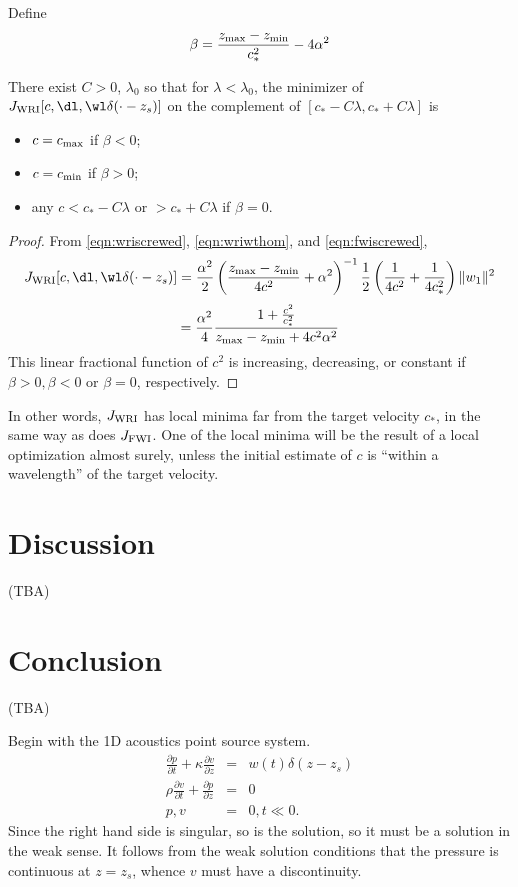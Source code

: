 Define
\begin{equation}
  \label{eqn:defbeta}
\beta = \frac{z_{\rm max}-z_{\rm min}}{c_*^2} - 4 \alpha^2
\end{equation}
\begin{theorem}
  \label{thm:thm2}
  There exist $C>0$, $\lambda_0$ so that for $\lambda <
  \lambda_0$, the minimizer of $J_{\rm WRI}[c,\dl,\wl \delta(\cdot-z_s)]$ on the
  complement of $[c_*-C\lambda, c_*+C\lambda]$ is
  \begin{itemize}
  \item $c=c_{\rm max}$ if $\beta<0$;
  \item $c=c_{\rm min}$ if $\beta>0$;
  \item any $c < c_*-C\lambda$ or $>c_*+C\lambda$ if $\beta=0$.
  \end{itemize}
\end{theorem}
\begin{proof}
  From \ref{eqn:wriscrewed}, \ref{eqn:wriwthom}, and
  \ref{eqn:fwiscrewed},
  \[
    J_{\rm WRI}[c,\dl,\wl\delta(\cdot-z_s)] =
    \frac{\alpha^2}{2}\left(\frac{z_{\rm max}-z_{\rm
          min}}{4c^2}+\alpha^2\right)^{-1}\frac{1}{2}\left(\frac{1}{4c^2}+\frac{1}{4c_*^2}\right)\|w_1\|^2
  \]
  \[
    =
    \frac{\alpha^2}{4}\frac{1+\frac{c^2}{c_*^2}}{z_{\rm 
        max}-z_{\rm min}+4c^2\alpha^2}
  \]
  This linear fractional function of $c^2$ is increasing, decreasing,
  or constant if $\beta>0, \beta<0$ or $\beta=0$, respectively.
\end{proof}

In other words, $J_{\rm WRI}$ has local minima far from the target
velocity $c_*$, in the same way as does $J_{\rm FWI}$. One of the
local minima will be the result of a local optimization almost surely,
unless the initial estimate of $c$ is ``within a wavelength'' of the
target velocity.

\section{Discussion}

(TBA)

\section{Conclusion}

(TBA)


Begin with the 1D acoustics point source system. 
\begin{eqnarray}
\label{eqn:awe1dptsrc}
\frac{\partial p}{\partial t} +\kappa\frac{\partial 
  v}{\partial z} &=& w(t)\delta(z-z_s) \nonumber\\
\rho \frac{\partial v}{\partial t} + \frac{\partial p}{\partial 
  z}&=&0\nonumber\\
 p,v&=&0, t \ll 0. 
\end{eqnarray}
Since the right hand side is singular, so is the solution, so it must
be a solution in the weak sense. It follows from the weak solution
conditions that the pressure is continuous at $z=z_s$, whence $v$ must
have a discontinuity. 

